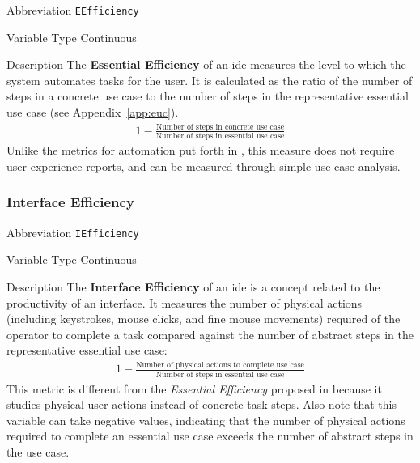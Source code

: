 \begin{AlignedDesc}
  \item[Abbreviation] \texttt{EEfficiency}

  \item[Variable Type] Continuous

  \item[Description] The \textbf{Essential Efficiency} of an \ac{ide}
  measures the level to which the system automates tasks for the user. It
  is calculated as the ratio of the number of steps in a concrete use case
  to the number of steps in the representative essential use case (see
  Appendix~\ref{app:euc}). \cite{constantine1996}
%
  \begin{align*}
    1 - \frac{\text{Number of steps in concrete use case}}
             {\text{Number of steps in essential use case}}
  \end{align*}
%
  Unlike the metrics for automation put forth in \cite{Wei1998}, this
  measure does not require user experience reports, and can be measured
  through simple use case analysis.

\end{AlignedDesc}

\subsubsection{Interface Efficiency}
\label{subsec:iefficiency}

\begin{AlignedDesc}
  \item[Abbreviation] \texttt{IEfficiency}

  \item[Variable Type] Continuous

  \item[Description] The \textbf{Interface Efficiency} of an \ac{ide} is a
  concept related to the productivity of an interface. It measures the
  number of physical actions (including keystrokes, mouse clicks, and fine
  mouse movements) required of the operator to complete a task compared
  against the number of abstract steps in the representative essential use
  case:
%
  \begin{align*}
    1 - \frac{\text{Number of physical actions to complete use case}}
             {\text{Number of steps in essential use case}}
  \end{align*}
%
  This metric is different from the \textit{Essential Efficiency} proposed
  in \cite{constantine1996} because it studies physical user actions
  instead of concrete task steps. Also note that this variable can take
  negative values, indicating that the number of physical actions required
  to complete an essential use case exceeds the number of abstract steps in
  the use case.

\end{AlignedDesc}

